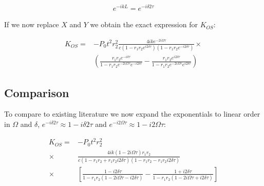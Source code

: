 \begin{align}
e^{-ikL}=e^{-i\delta 2\tau}%
\end{align}


If we now replace $X$ and $Y$ we obtain the exact expression for $K_{OS}$:%

\begin{align}
K_{OS}=&-P_0 t^2 r_2^2 \frac{4ike^{-2i\Omega\tau}}{c(1-r_1\!r_2e^{i2\delta\tau})(1-r_1\!r_2e^{-i2\delta\tau})}\times\nonumber\\
 & \left( \frac{r_1\!r_2e^{-i\delta \tau}}{1\!-\!r_1\!r_2e^{-2i\Omega\tau} e^{-i2\delta\tau}}
 \!-\!\frac{r_1\!r_2e^{i2\delta\tau}}{1\!-\!r_1\!r_2e^{-2i\Omega\tau}e^{i2\delta\tau}} \right) 
\end{align}

\subsection{Comparison}

To compare to existing literature we now expand the exponentials to linear order 
in $\Omega$ and $\delta$, 
$e^{-i\delta 2\tau}\approx 1-i\delta 2\tau$
and $e^{-i2\Omega \tau}\approx 1-i2\Omega \tau$:

\begin{align}
K_{OS} =& - P_0 t^2 r_2^2 \nonumber \\ 
 \times  &\frac{4ik(1-2i\Omega\tau)r_1r_2}{c(1-r_1r_2+r_1r_2i2\delta\tau)(1-r_1r_2-r_1r_2i2\delta\tau)}\nonumber\\
 \times  &\left[\frac{1-i2\delta\tau}{1-r_1r_2(1-2i\Omega\tau-i2\delta\tau)} \nonumber
- \frac{1+i2\delta\tau}{1-r_1r_2(1-2i\Omega\tau+i2\delta\tau)} \right] \\
\end{align}



